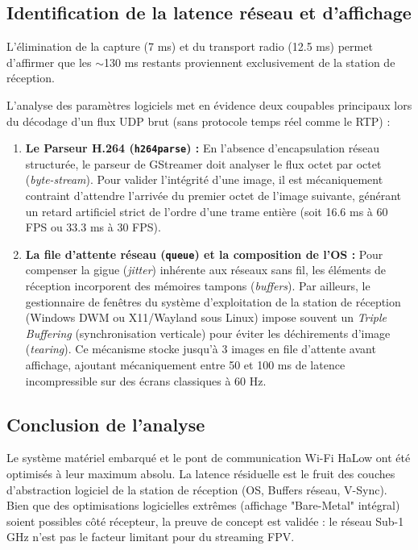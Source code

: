 \subsection{Identification de la latence réseau et d'affichage}
L'élimination de la capture (7 ms) et du transport radio (12.5 ms) permet d'affirmer que les $\sim$130 ms restants proviennent exclusivement de la station de réception. 

L'analyse des paramètres logiciels met en évidence deux coupables principaux lors du décodage d'un flux UDP brut (sans protocole temps réel comme le RTP) :
\begin{enumerate}
    \item \textbf{Le Parseur H.264 (\texttt{h264parse}) :} En l'absence d'encapsulation réseau structurée, le parseur de GStreamer doit analyser le flux octet par octet (\textit{byte-stream}). Pour valider l'intégrité d'une image, il est mécaniquement contraint d'attendre l'arrivée du premier octet de l'image suivante, générant un retard artificiel strict de l'ordre d'une trame entière (soit 16.6 ms à 60 FPS ou 33.3 ms à 30 FPS).
    \item \textbf{La file d'attente réseau (\texttt{queue}) et la composition de l'OS :} Pour compenser la gigue (\textit{jitter}) inhérente aux réseaux sans fil, les éléments de réception incorporent des mémoires tampons (\textit{buffers}). Par ailleurs, le gestionnaire de fenêtres du système d'exploitation de la station de réception (Windows DWM ou X11/Wayland sous Linux) impose souvent un \textit{Triple Buffering} (synchronisation verticale) pour éviter les déchirements d'image (\textit{tearing}). Ce mécanisme stocke jusqu'à 3 images en file d'attente avant affichage, ajoutant mécaniquement entre 50 et 100 ms de latence incompressible sur des écrans classiques à 60 Hz.
\end{enumerate}

\subsection{Conclusion de l'analyse}
Le système matériel embarqué et le pont de communication Wi-Fi HaLow ont été optimisés à leur maximum absolu. La latence résiduelle est le fruit des couches d'abstraction logiciel de la station de réception (OS, Buffers réseau, V-Sync). Bien que des optimisations logicielles extrêmes (affichage "Bare-Metal" intégral) soient possibles côté récepteur, la preuve de concept est validée : le réseau Sub-1 GHz n'est pas le facteur limitant pour du streaming FPV.